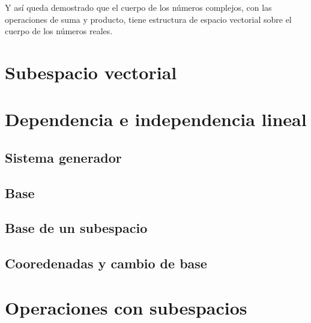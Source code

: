 \documentclass[0_algebra.tex]{subfiles}
\begin{document}
Y así queda demostrado que el cuerpo de los números complejos, con las operaciones de suma y producto, tiene estructura de espacio vectorial sobre el cuerpo de los números reales.
\section{Subespacio vectorial}
\begin{figure}[h]
	\centering
	
\end{figure}


\section{Dependencia e independencia lineal}
\begin{figure}[h]
	\centering
	
\end{figure}
\subsection{Sistema generador}
\begin{figure}[h]
	\centering
	
\end{figure}
\subsection{Base}\begin{figure}[h]
	\centering
	
\end{figure}
\subsection{Base de un subespacio}
\begin{figure}[h]
	\centering
	
\end{figure}
\subsection{Cooredenadas y cambio de base}
\begin{figure}[h]
	\centering
	
\end{figure}

\section{Operaciones con subespacios}
\end{document}
